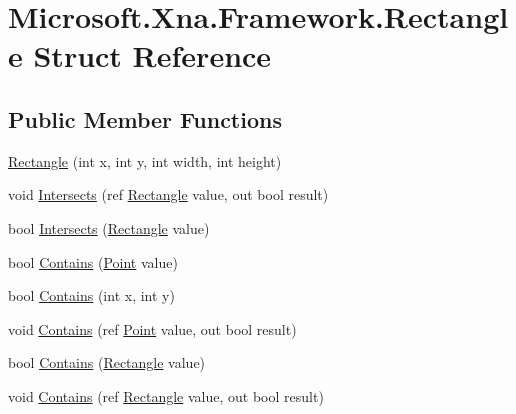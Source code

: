 \hypertarget{struct_microsoft_1_1_xna_1_1_framework_1_1_rectangle}{}\section{Microsoft.\+Xna.\+Framework.\+Rectangle Struct Reference}
\label{struct_microsoft_1_1_xna_1_1_framework_1_1_rectangle}
\subsection*{Public Member Functions}
\begin{DoxyCompactItemize}
\item 
\hyperlink{struct_microsoft_1_1_xna_1_1_framework_1_1_rectangle_ad4860305cd72c200554b0db21e7baf9a}{Rectangle} (int x, int y, int width, int height)
\item 
void \hyperlink{struct_microsoft_1_1_xna_1_1_framework_1_1_rectangle_afb7d0a4e436bac53191058f9d7d21ad9}{Intersects} (ref \hyperlink{struct_microsoft_1_1_xna_1_1_framework_1_1_rectangle}{Rectangle} value, out bool result)
\item 
bool \hyperlink{struct_microsoft_1_1_xna_1_1_framework_1_1_rectangle_a119382dcd1c80c1fe31f6fbf48002f0b}{Intersects} (\hyperlink{struct_microsoft_1_1_xna_1_1_framework_1_1_rectangle}{Rectangle} value)
\item 
bool \hyperlink{struct_microsoft_1_1_xna_1_1_framework_1_1_rectangle_a39f49c99c9de80b0e2eba934f65e5fd1}{Contains} (\hyperlink{struct_microsoft_1_1_xna_1_1_framework_1_1_point}{Point} value)
\item 
bool \hyperlink{struct_microsoft_1_1_xna_1_1_framework_1_1_rectangle_aa1864f4a3078bdd2f9b9e834e7b61bb2}{Contains} (int x, int y)
\item 
void \hyperlink{struct_microsoft_1_1_xna_1_1_framework_1_1_rectangle_a0760fa296f6cb7cd3da9add3a376e0c8}{Contains} (ref \hyperlink{struct_microsoft_1_1_xna_1_1_framework_1_1_point}{Point} value, out bool result)
\item 
bool \hyperlink{struct_microsoft_1_1_xna_1_1_framework_1_1_rectangle_a03dc1766fcd22c58d716837c6f18a1a8}{Contains} (\hyperlink{struct_microsoft_1_1_xna_1_1_framework_1_1_rectangle}{Rectangle} value)
\item 
void \hyperlink{struct_microsoft_1_1_xna_1_1_framework_1_1_rectangle_ae134c81c94dd138f52a304df55e2121d}{Contains} (ref \hyperlink{struct_microsoft_1_1_xna_1_1_framework_1_1_rectangle}{Rectangle} value, out bool result)

\end{DoxyCompactItemize}
